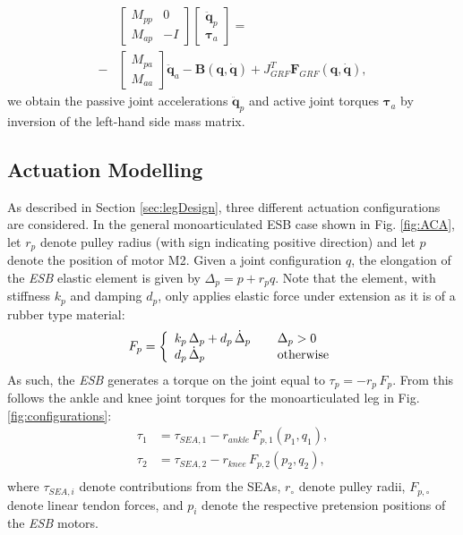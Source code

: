 \documentclass[letterpaper, 10 pt, conference]{ieeeconf}  %
\begin{document}
\begin{equation}
\begin{aligned}
&\left[\begin{array}{cc}  
M_{pp} & 0\\
M_{ap} &-I
\end{array} \right]
\left[\begin{array}{c}  
\mathbf{\ddot q}_p\\
\boldsymbol{\tau}_a
\end{array} \right] =\\ 
-&
\left[\begin{array}{c}  
M_{pa}\\
M_{aa}
\end{array} \right] 
\mathbf{\ddot q}_a-
\mathbf{B(q, \dot q)}+
J_{GRF}^T \mathbf{F}_{GRF}\mathbf{(q, \dot q)},
\end{aligned}
\end{equation}	
we obtain the passive joint accelerations $\mathbf{\ddot q}_p$ and active joint torques $\boldsymbol{\tau}_a$ by inversion of the left-hand side mass matrix.


\subsection{Actuation Modelling}
\label{subsec:actuationModel}
As described in Section \ref{sec:legDesign}, three different actuation configurations are considered. In the general monoarticulated ESB case shown in Fig. \ref{fig:ACA}, let $r_p$ denote pulley radius (with sign indicating positive direction) and let $p$ denote the position of motor M2. Given a joint configuration $q$, the elongation of the \textit{ESB} elastic element is given by $\Delta_p = p + r_p q$. Note that the element, with stiffness $k_p$ and damping $d_p$, only applies elastic force under extension as it is of a rubber type material:
\begin{equation}
F_p =	\left\lbrace
\begin{array}{ll}
k_p \, \Delta_p + d_p \, \dot{\Delta}_p	\hspace{0.4cm} & \Delta_p > 0\\
d_p \, \dot{\Delta}_p & \text{otherwise}
\end{array}
\right.
\label{eq:F_p}
\end{equation}   
As such, the \textit{ESB} generates a torque on the joint equal to $\tau_p = -r_p \, F_p$. From this follows the ankle and knee joint torques for the monoarticulated leg in Fig. \ref{fig:configurations}:
\begin{equation}
	\begin{aligned}
		\tau_1 &= \tau_{SEA,1} - r_{ankle} \, F_{p,1}(p_1,q_1), \\
		\tau_2 &= \tau_{SEA,2} - r_{knee} \, F_{p,2}(p_2,q_2), \\
	\end{aligned}
\end{equation}
where $\tau_{SEA,i}$ denote contributions from the SEAs, $r_\circ$ denote pulley radii, $F_{p,\circ}$ denote linear tendon forces, and $p_i$ denote the respective pretension positions of the \textit{ESB} motors.
\end{document}
